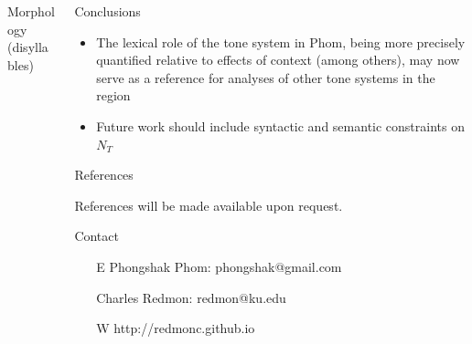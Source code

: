 \documentclass[final]{beamer}
\begin{document}
\begin{frame}[t]
\begin{columns}[t]
\begin{column}{0.85\paperwidth}
\begin{columns}[t,totalwidth=0.85\paperwidth]
\begin{column}{0.4\paperwidth}
\begin{block}{Morphology (disyllables)}
\end{block}

\end{column} 

\begin{column}{0.4\paperwidth}
\vspace{-.6in}

\begin{block}{Conclusions}
  \begin{itemize}
  \item The lexical role of the tone system in Phom, being more precisely quantified relative to effects of context (among others), may now serve as a reference for analyses of other tone systems in the region
    \item Future work should include syntactic and semantic constraints on $N_T$
  \end{itemize}
\end{block}

\begin{block}{References}
\footnotesize
\begin{center}
References will be made available upon request.
\end{center}
\end{block}

\begin{block}{Contact}
\footnotesize
  \begin{itemize}
    \item[E] Phongshak Phom: phongshak@gmail.com
    \item[] Charles Redmon: redmon@ku.edu
    \item[W] http://redmonc.github.io
  \end{itemize}
\end{block}



\end{column} 


\end{columns} %


\end{column} 



\end{columns} %

\end{frame} %
\end{document}
